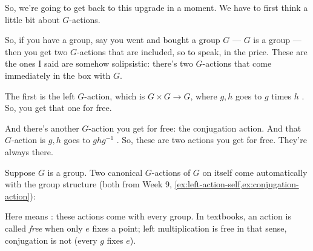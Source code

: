 \begin{speech}[00:09:12 - 00:10:16]
So, we're going to get back to this upgrade in a moment. We have to first think a little bit about $G$-actions.

So, if you have a group, say you went and bought a group $G$ --- $G$ is a group  --- then you get two $G$-actions that are included, so to speak, in the price. These are the ones I said are somehow solipsistic: there's two $G$-actions that come immediately in the box with $G$.

The first is the left $G$-action, which is $G \times G \to G$, where $g, h$ goes to $g$ times $h$ . So, you get that one for free.

And there's another $G$-action you get for free: the conjugation action. And that $G$-action is $g, h$ goes to $g h g^{-1}$ . So, these are two actions you get for free. They're always there.
\end{speech}

\begin{content}
Suppose $G$ is a group. Two canonical $G$-actions of $G$ on itself come automatically with the group structure (both from Week 9, \cref{ex:left-action-self,ex:conjugation-action}):

\end{content}

\begin{aiNote}
Here  means : these actions come with every group. In textbooks, an action is called \emph{free} when only $e$ fixes a point; left multiplication is free in that sense, conjugation is not (every $g$ fixes $e$).
\end{aiNote}


